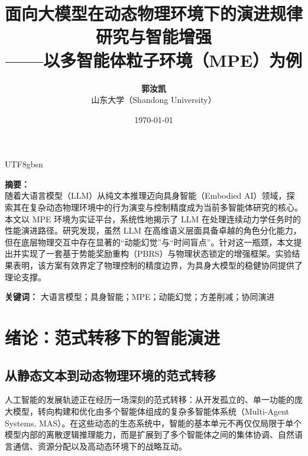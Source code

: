 \documentclass[11pt,a4paper]{article}
\title{
    \vspace{2cm}
    \textbf{\huge 面向大模型在动态物理环境下的演进规律研究与智能增强} \\
    \vspace{0.5cm}
    \large ——以多智能体粒子环境（MPE）为例
    \vspace{1cm}
}
\author{
    \Large \textbf{郭汝凯} \\
    \vspace{0.3cm}
    \large 山东大学（Shandong University）
    \vspace{1cm}
}
\date{\today}
\begin{document}
\begin{CJK*}{UTF8}{gbsn}

\maketitle
\thispagestyle{empty} 

\vspace{1.5cm}

\begin{mdframed}[
    backgroundcolor=LightBlueBg, 
    linecolor=SDUBlue, 
    linewidth=1.2pt, 
    innertopmargin=15pt, 
    innerbottommargin=15pt,
    roundcorner=8pt
]
\textbf{\large 摘要：} \\
随着大语言模型（LLM）从纯文本推理迈向具身智能（Embodied AI）领域，探索其在复杂动态物理环境中的行为演变与控制精度成为当前多智能体研究的核心。本文以 MPE 环境为实证平台，系统性地揭示了 LLM 在处理连续动力学任务时的性能演进路径。研究发现，虽然 LLM 在高维语义层面具备卓越的角色分化能力，但在底层物理交互中存在显著的“动能幻觉”与“时间盲点”。针对这一瓶颈，本文提出并实现了一套基于势能奖励重构（PBRS）与物理状态锁定的增强框架。实验结果表明，该方案有效界定了物理控制的精度边界，为具身大模型的稳健协同提供了理论支撑。
\end{mdframed}

\vspace{0.8cm}
\textbf{关键词：} 大语言模型；具身智能；MPE；动能幻觉；方差削减；协同演进

\newpage 

\renewcommand{\contentsname}{\centering \textcolor{SDUBlue}{目~录}} 
\vspace*{1cm}
\tableofcontents
\newpage 

\setcounter{page}{1}   

\section{绪论：范式转移下的智能演进}

\subsection{从静态文本到动态物理环境的范式转移}
人工智能的发展轨迹正在经历一场深刻的范式转移：从开发孤立的、单一功能的庞大模型，转向构建和优化由多个智能体组成的复杂多智能体系统（Multi-Agent Systems, MAS）。在这些动态的生态系统中，智能的基本单元不再仅仅局限于单个模型内部的离散逻辑推理能力，而是扩展到了多个智能体之间的集体协调、自然语言通信、资源分配以及高动态环境下的战略互动。


\end{CJK*}
\end{document}
